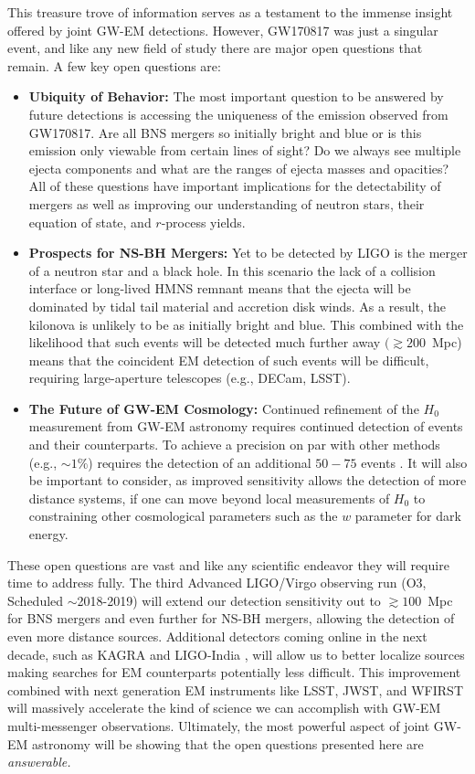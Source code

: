 This treasure trove of information serves as a testament to the immense insight offered by joint GW-EM detections. However, GW170817 was just a singular event, and like any new field of study there are major open questions that remain. A few key open questions are:
\begin{itemize}
\item {\bf Ubiquity of Behavior:} The most important question to be answered by future detections is accessing the uniqueness of the emission observed from GW170817. Are all BNS mergers so initially bright and blue or is this emission only viewable from certain lines of sight? Do we always see multiple ejecta components and what are the ranges of ejecta masses and opacities? All of these questions have important implications for the detectability of mergers as well as improving our understanding of neutron stars, their equation of state, and $r$-process yields.
\item {\bf Prospects for NS-BH Mergers:} Yet to be detected by LIGO is the merger of a neutron star and a black hole. In this scenario the lack of a collision interface or long-lived HMNS remnant means that the ejecta will be dominated by tidal tail material and accretion disk winds. As a result, the kilonova is unlikely to be as initially bright and blue. This combined with the likelihood that such events will be detected much further away $(\gtrsim 200$~Mpc) means that the coincident EM detection of such events will be difficult, requiring large-aperture telescopes (e.g., DECam, LSST).
\item {\bf The Future of GW-EM Cosmology:} Continued refinement of the $H_0$ measurement from GW-EM astronomy requires continued detection of events and their counterparts. To achieve a precision on par with other methods (e.g., $\sim1\%$) requires the detection of an additional $50-75$ events \citep{Guidorzi+17}. It will also be important to consider, as improved sensitivity allows the detection of more distance systems, if one can move beyond local measurements of $H_0$ to constraining other cosmological parameters such as the $w$ parameter for dark energy. 
\end{itemize}

These open questions are vast and like any scientific endeavor they will require time to address fully. The third Advanced LIGO/Virgo observing run (O3, Scheduled $\sim$2018-2019) will extend our detection sensitivity out to $\gtrsim100$~Mpc for BNS mergers and even further for NS-BH mergers, allowing the detection of even more distance sources. Additional detectors coming online in the next decade, such as KAGRA \citep{KAGRA} and LIGO-India \citep{LIGOIndia}, will allow us to better localize sources making searches for EM counterparts potentially less difficult. This improvement combined with next generation EM instruments like LSST, JWST, and WFIRST will massively accelerate the kind of science we can accomplish with GW-EM multi-messenger observations. Ultimately, the most powerful aspect of joint GW-EM astronomy will be showing that the open questions presented here are {\it answerable.}
